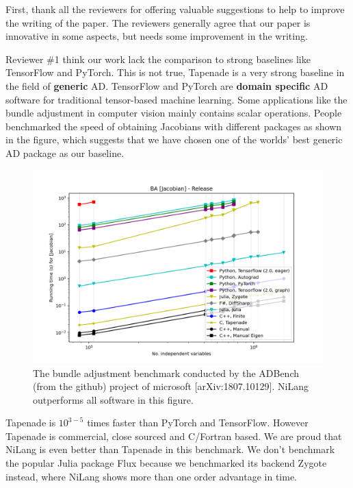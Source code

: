 \documentclass{article}
\begin{document}
First, thank all the reviewers for offering valuable suggestions to help to improve the writing of the paper.
The reviewers generally agree that our paper is innovative in some aspects, but needs some improvement in the writing.

Reviewer \#1 think our work lack the comparison to strong baselines like TensorFlow and PyTorch.
This is not true, Tapenade is a very strong baseline in the field of \textbf{generic} AD.
TensorFlow and PyTorch are \textbf{domain specific} AD software for traditional tensor-based machine learning.
Some applications like the bundle adjustment in computer vision mainly contains scalar operations.
People benchmarked the speed of obtaining Jacobians with different packages as shown in the figure, which suggests that we have chosen one of the worlds' best generic AD package as our baseline.
\begin{figure}
    \centerline{\includegraphics[width=0.5\columnwidth,trim={0 1cm 1cm 1.7cm},clip]{ba-jacobian-adbench.png}}
    \caption{The bundle adjustment benchmark conducted by the ADBench (from the github) project of microsoft [arXiv:1807.10129]. NiLang outperforms all software in this figure.}\label{bench-ba}
\end{figure}
Tapenade is $10^{3-5}$ times faster than PyTorch and TensorFlow. However Tapenade is commercial, close sourced and C/Fortran based.
We are proud that NiLang is even better than Tapenade in this benchmark.
We don't benchmark the popular Julia package Flux because we benchmarked its backend Zygote instead, where NiLang shows more than one order advantage in time.
\end{document}

